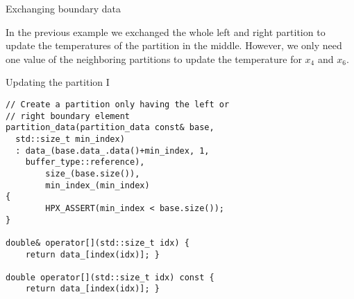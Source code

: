 \documentclass[\classoption]{beamer}
\begin{document}
\begin{frame}{Exchanging boundary data}

\begin{center}

\end{center}

In the previous example we exchanged the whole left and right partition to update the temperatures of the partition in the middle. However, we only need one value of the neighboring partitions to update the temperature for $x_4$ and $x_6$.

\end{frame}

\begin{frame}[fragile]{Updating the partition I }

\begin{lstlisting}
// Create a partition only having the left or 
// right boundary element
partition_data(partition_data const& base, 
  std::size_t min_index)
  : data_(base.data_.data()+min_index, 1, 
  	buffer_type::reference),
        size_(base.size()),
        min_index_(min_index)
{
        HPX_ASSERT(min_index < base.size());
}

double& operator[](std::size_t idx) { 
	return data_[index(idx)]; }

double operator[](std::size_t idx) const { 
	return data_[index(idx)]; }
	
\end{lstlisting}

\end{frame}
\end{document}
